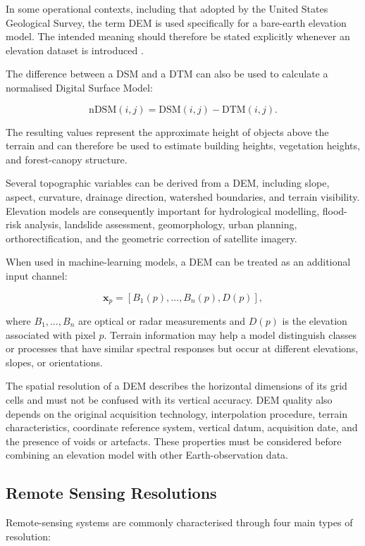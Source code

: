 \documentclass[11pt,a4paper]{article}
\begin{document}
In some operational contexts, including that adopted by the United
States Geological Survey, the term DEM is used specifically for a
bare-earth elevation model. The intended meaning should therefore be
stated explicitly whenever an elevation dataset is introduced
\cite{usgs_dem_definition}.

The difference between a DSM and a DTM can also be used to calculate a
normalised Digital Surface Model:

\[
\mathrm{nDSM}(i,j)
=
\mathrm{DSM}(i,j)-\mathrm{DTM}(i,j).
\]

The resulting values represent the approximate height of objects above
the terrain and can therefore be used to estimate building heights,
vegetation heights, and forest-canopy structure.

Several topographic variables can be derived from a DEM, including
slope, aspect, curvature, drainage direction, watershed boundaries, and
terrain visibility. Elevation models are consequently important for
hydrological modelling, flood-risk analysis, landslide assessment,
geomorphology, urban planning, orthorectification, and the geometric
correction of satellite imagery.

When used in machine-learning models, a DEM can be treated as an
additional input channel:

\[
\mathbf{x}_p =
\left[
B_1(p),\ldots,B_n(p),D(p)
\right],
\]

where \(B_1,\ldots,B_n\) are optical or radar measurements and \(D(p)\)
is the elevation associated with pixel \(p\). Terrain information may
help a model distinguish classes or processes that have similar
spectral responses but occur at different elevations, slopes, or
orientations.

The spatial resolution of a DEM describes the horizontal dimensions of
its grid cells and must not be confused with its vertical accuracy.
DEM quality also depends on the original acquisition technology,
interpolation procedure, terrain characteristics, coordinate reference
system, vertical datum, acquisition date, and the presence of voids or
artefacts. These properties must be considered before combining an
elevation model with other Earth-observation data.

\subsection{Remote Sensing Resolutions}

Remote-sensing systems are commonly characterised through four main
types of resolution:
\end{document}
